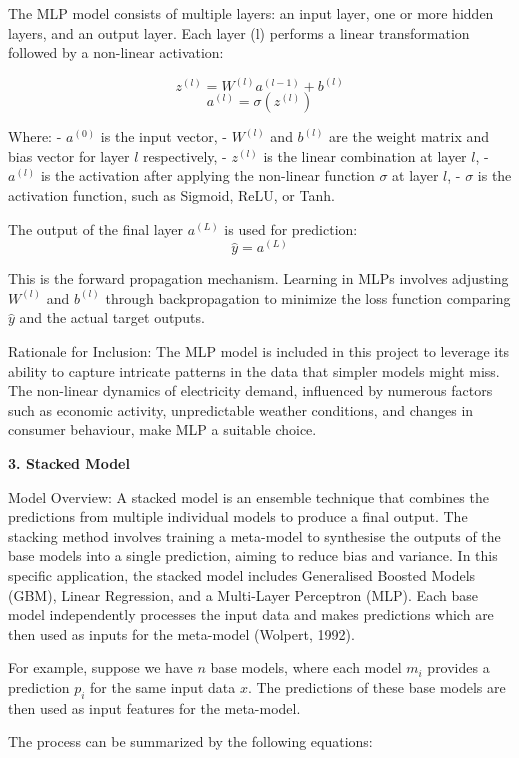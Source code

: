 \documentclass[
]{article}
\begin{document}
The MLP model consists of multiple layers: an input layer, one or more
hidden layers, and an output layer. Each layer (l) performs a linear
transformation followed by a non-linear activation:

\[ z^{(l)} = W^{(l)}a^{(l-1)} + b^{(l)} \]
\[ a^{(l)} = \sigma(z^{(l)}) \]

Where: - \(a^{(0)}\) is the input vector, - \(W^{(l)}\) and \(b^{(l)}\)
are the weight matrix and bias vector for layer \(l\) respectively, -
\(z^{(l)}\) is the linear combination at layer \(l\), - \(a^{(l)}\) is
the activation after applying the non-linear function \(\sigma\) at
layer \(l\), - \(\sigma\) is the activation function, such as Sigmoid,
ReLU, or Tanh.

The output of the final layer \(a^{(L)}\) is used for prediction:
\[ \hat{y} = a^{(L)} \]

This is the forward propagation mechanism. Learning in MLPs involves
adjusting \(W^{(l)}\) and \(b^{(l)}\) through backpropagation to
minimize the loss function comparing \(\hat{y}\) and the actual target
outputs.

Rationale for Inclusion: The MLP model is included in this project to
leverage its ability to capture intricate patterns in the data that
simpler models might miss. The non-linear dynamics of electricity
demand, influenced by numerous factors such as economic activity,
unpredictable weather conditions, and changes in consumer behaviour,
make MLP a suitable choice.

\textbf{3. Stacked Model}

Model Overview: A stacked model is an ensemble technique that combines
the predictions from multiple individual models to produce a final
output. The stacking method involves training a meta-model to synthesise
the outputs of the base models into a single prediction, aiming to
reduce bias and variance. In this specific application, the stacked
model includes Generalised Boosted Models (GBM), Linear Regression, and
a Multi-Layer Perceptron (MLP). Each base model independently processes
the input data and makes predictions which are then used as inputs for
the meta-model (Wolpert, 1992).

For example, suppose we have \(n\) base models, where each model \(m_i\)
provides a prediction \(p_i\) for the same input data \(x\). The
predictions of these base models are then used as input features for the
meta-model.

The process can be summarized by the following equations:
\end{document}
